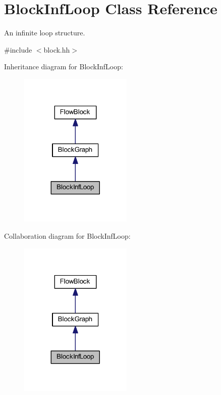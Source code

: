 \hypertarget{class_block_inf_loop}{}\section{Block\+Inf\+Loop Class Reference}
\label{class_block_inf_loop}


An infinite loop structure.  




{\ttfamily \#include $<$block.\+hh$>$}



Inheritance diagram for Block\+Inf\+Loop\+:
\nopagebreak
\begin{figure}[H]
\begin{center}
\leavevmode
\includegraphics[width=152pt]{class_block_inf_loop__inherit__graph}
\end{center}
\end{figure}


Collaboration diagram for Block\+Inf\+Loop\+:
\nopagebreak
\begin{figure}[H]
\begin{center}
\leavevmode
\includegraphics[width=152pt]{class_block_inf_loop__coll__graph}
\end{center}
\end{figure}
